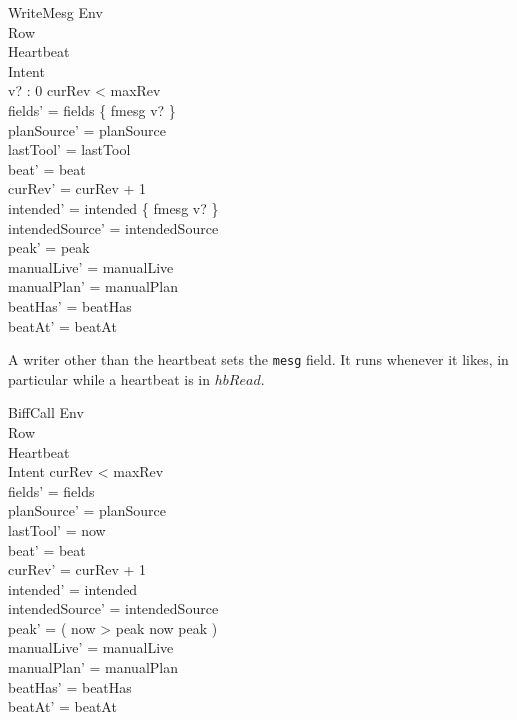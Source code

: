\documentclass[a4paper,10pt,fleqn]{article}
\begin{document}
\begin{schema}{WriteMesg}
  \Xi Env \\
  \Delta Row \\
  \Xi Heartbeat \\
  \Delta Intent \\
  v? : 0 
  \where
  curRev < maxRev \\
  fields' = fields \oplus \{ fmesg \mapsto v? \} \\
  planSource' = planSource \\
  lastTool' = lastTool \\
  beat' = beat \\
  curRev' = curRev + 1 \\
  intended' = intended \oplus \{ fmesg \mapsto v? \} \\
  intendedSource' = intendedSource \\
  peak' = peak \\
  manualLive' = manualLive \\
  manualPlan' = manualPlan \\
  beatHas' = beatHas \\
  beatAt' = beatAt
\end{schema}

A writer other than the heartbeat sets the \texttt{mesg} field.  It runs
whenever it likes, in particular while a heartbeat is in $hbRead$.

\begin{schema}{BiffCall}
  \Xi Env \\
  \Delta Row \\
  \Xi Heartbeat \\
  \Delta Intent
  \where
  curRev < maxRev \\
  fields' = fields \\
  planSource' = planSource \\
  lastTool' = now \\
  beat' = beat \\
  curRev' = curRev + 1 \\
  intended' = intended \\
  intendedSource' = intendedSource \\
  peak' = ( \IF now > peak \THEN now \ELSE peak ) \\
  manualLive' = manualLive \\
  manualPlan' = manualPlan \\
  beatHas' = beatHas \\
  beatAt' = beatAt
\end{schema}
\end{document}
